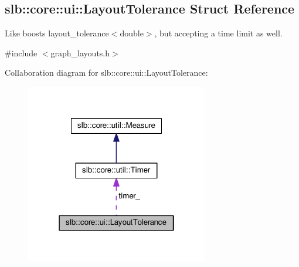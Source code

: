 \hypertarget{structslb_1_1core_1_1ui_1_1LayoutTolerance}{}\subsection{slb\+:\+:core\+:\+:ui\+:\+:Layout\+Tolerance Struct Reference}
\label{structslb_1_1core_1_1ui_1_1LayoutTolerance}


Like boost\textquotesingle{}s {\ttfamily layout\+\_\+tolerance$<$double$>$}, but accepting a time limit as well.  




{\ttfamily \#include $<$graph\+\_\+layouts.\+h$>$}



Collaboration diagram for slb\+:\+:core\+:\+:ui\+:\+:Layout\+Tolerance\+:\nopagebreak
\begin{figure}[H]
\begin{center}
\leavevmode
\includegraphics[width=226pt]{structslb_1_1core_1_1ui_1_1LayoutTolerance__coll__graph}
\end{center}
\end{figure}
